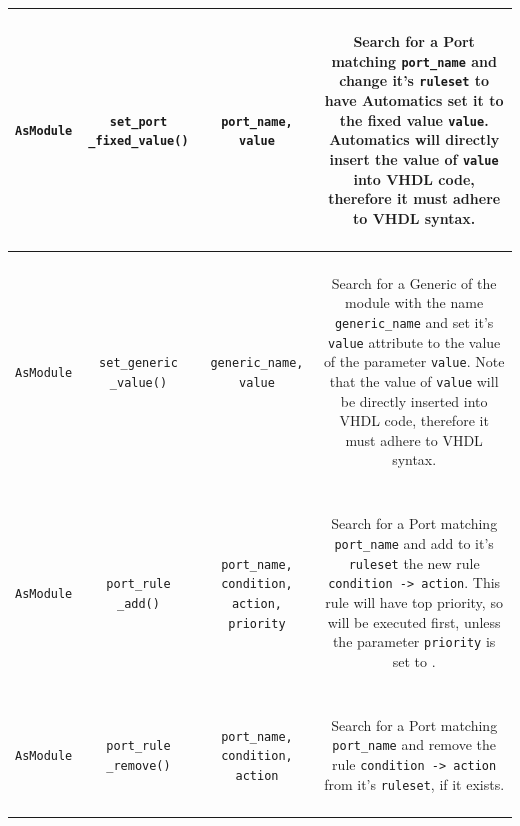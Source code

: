 \begin{longtable}[htbp]{|c|c|c|c|}
\parbox{2.5cm}{~\\ \texttt{AsModule}\\~} & \parbox{3cm}{~\\ \texttt{set\_port \_fixed\_value()}\\~} & \parbox{3cm}{~ \\ \texttt{port\_name, value} \\ ~} & \parbox{6cm}{~\\ Search for a Port matching \texttt{port\_name} and change it's \texttt{ruleset} to have Automatics set it to the fixed value \texttt{value}. Automatics will directly insert the value of \texttt{value} into VHDL code, therefore it must adhere to VHDL syntax. \\~}\\
\hline
\parbox{2.5cm}{~\\ \texttt{AsModule}\\~} & \parbox{3cm}{~\\ \texttt{set\_generic \_value()}\\~} & \parbox{3cm}{~ \\ \texttt{generic\_name, value} \\ ~} & \parbox{6cm}{~\\ Search for a Generic of the module with the name \texttt{generic\_name} and set it's \texttt{value} attribute to the value of the parameter \texttt{value}. Note that the value of \texttt{value} will be directly inserted into VHDL code, therefore it must adhere to VHDL syntax. \\~}\\
\hline
\parbox{2.5cm}{~\\ \texttt{AsModule}\\~} & \parbox{3cm}{~\\ \texttt{port\_rule \_add()}\\~} & \parbox{3cm}{~ \\ \texttt{port\_name, condition, action, priority} \\ ~} & \parbox{6cm}{~\\ Search for a Port matching \texttt{port\_name} and add to it's \texttt{ruleset} the new rule \texttt{condition -> action}. This rule will have top priority, so will be executed first, unless the parameter \texttt{priority} is set to . \\~}\\
\hline
\parbox{2.5cm}{~\\ \texttt{AsModule}\\~} & \parbox{3cm}{~\\ \texttt{port\_rule \_remove()}\\~} & \parbox{3cm}{~ \\ \texttt{port\_name, condition, action} \\ ~} & \parbox{6cm}{~\\ Search for a Port matching \texttt{port\_name} and remove the rule \texttt{condition -> action} from it's \texttt{ruleset}, if it exists. \\~}\\

\end{longtable}
